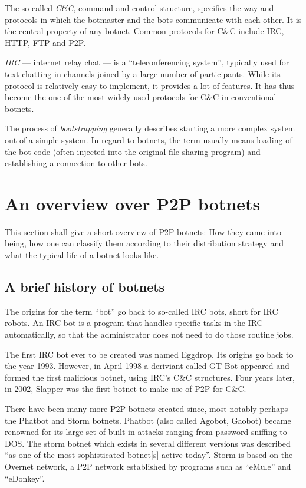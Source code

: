 \documentclass{llncs}
\begin{document}
The so-called {\it C\&C}, command and control structure, specifies
the way and protocols in which the botmaster and the bots communicate
with each other. It is the central property of any botnet. Common
protocols for C\&C include IRC, HTTP, FTP and
P2P.\cite{borgaonkar2010analysis}

{\it IRC} --- internet relay chat --- is a ``teleconferencing
system''\cite{irc}, typically used for text chatting in channels
joined by a large number of participants. While its protocol is
relatively easy to implement, it provides a lot of features. It has
thus become the one of the most widely-used protocols for C\&C in
conventional botnets.

The process of {\it bootstrapping} generally describes starting a more
complex system out of a simple system. In regard to botnets, the
term usually means loading of the bot code (often injected into the
original file sharing program) and establishing a connection to other
bots.\cite{wang2009systematic}


\section{An overview over P2P botnets}
This section shall give a short overview of P2P botnets: How they came
into being, how one can classify them according to their distribution
strategy and what the typical life of a botnet looks like.

\subsection{A brief history of botnets}
The origins for the term ``bot'' go back to so-called IRC bots, short
for IRC robots. An IRC bot is a program that handles specific tasks in
the IRC automatically, so that the administrator does not need to do
those routine jobs.

The first IRC bot ever to be created was named Eggdrop. Its origins go
back to the year 1993. However, in April 1998 a deriviant called
GT-Bot appeared and formed the first malicious botnet, using IRC's
C\&C structures. Four years later, in 2002, Slapper was the first
botnet to make use of P2P for C\&C.\cite{li2009botnet}

There have been many more P2P botnets created since, most notably
perhaps the Phatbot and Storm botnets. Phatbot (also called Agobot,
Gaobot) became renowned for its large set of built-in attacks ranging
from password sniffing to DOS.\cite{cooke2005zombie} The storm botnet
which exists in several different versions was described ``as one of
the most sophisticated botnet[s] active
today''\cite{davis2008sybil}. Storm is based on the Overnet network, a
P2P network established by programs such as ``eMule'' and ``eDonkey''.
\end{document}
